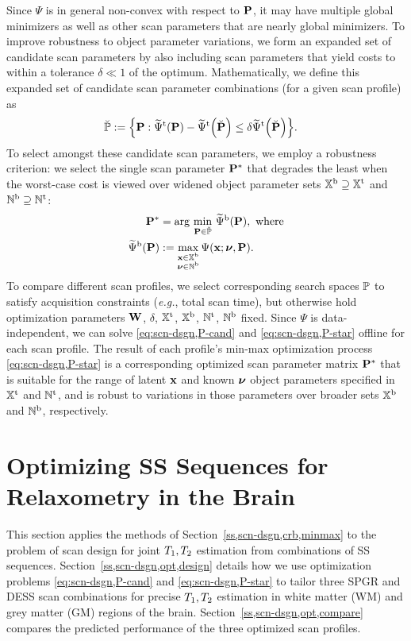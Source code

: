 Since $\Psi$ is in general non-convex 
with respect to $\mathbf{P}$, 
it may have multiple global minimizers 
as well as other scan parameters 
that are nearly global minimizers. 
To improve robustness 
to object parameter variations, 
we form an expanded set of candidate scan parameters 
by also including scan parameters 
that yield costs to within a tolerance $\delta \ll 1$ 
of the optimum. 
Mathematically, 
we define this expanded set 
of candidate scan parameter combinations 
(for a given scan profile) as 
\begin{align}
	\setPc &:= 
		\set{\bmP : \costawt{\bmP} - \costawt{\bmPc} \le \delta \costawt{\bmPc}}.
		\label{eq:scn-dsgn,set}
\end{align}
To select amongst these candidate scan parameters, 
we employ a robustness criterion: 
we select the single scan parameter $\mathbf{P}^*$ 
that degrades the least 
when the worst-case cost is viewed 
over widened object parameter sets 
$\mathbb{X}^\mathrm{b} \supseteq \mathbb{X}^\mathrm{t}$ and $\mathbb{N}^\mathrm{b} \supseteq \mathbb{N}^\mathrm{t}$:
\begin{align}
	\bmPs &= 
		\argmin{\bmP \in \setPc} \costawb{\bmP}, \where
		\label{eq:scn-dsgn,P-star} \\
	\costawb{\bmP} &:=
		\max_{\substack{\bmx \in \setXb \\ \bmnu \in \setNb}}
		\costa{\bmx; \bmnu, \bmP}.
		\label{eq:scn-dsgn,cost-broad}
\end{align}
To compare different scan profiles, 
we select corresponding search spaces $\mathbb{P}$ 
to satisfy acquisition constraints 
(\emph{e.g.}, total scan time), 
but otherwise hold optimization parameters 
$\mathbf{W}$, $\delta$, $\mathbb{X}^\mathrm{t}$, $\mathbb{X}^\mathrm{b}$, $\mathbb{N}^\mathrm{t}$, $\mathbb{N}^\mathrm{b}$ fixed.
Since $\Psi$ is data-independent, 
we can solve \eqref{eq:scn-dsgn,P-cand} and \eqref{eq:scn-dsgn,P-star} offline 
for each scan profile. 
The result of each profile's min-max optimization process \eqref{eq:scn-dsgn,P-star} 
is a corresponding optimized scan parameter matrix $\mathbf{P}^*$ 
that is suitable for the range 
of latent $\mathbf{x}$ and known $\boldsymbol{\nu}$ object parameters specified 
in $\mathbb{X}^\mathrm{t}$ and $\mathbb{N}^\mathrm{t}$, 
and is robust to variations in those parameters 
over broader sets $\mathbb{X}^\mathrm{b}$ and $\mathbb{N}^\mathrm{b}$, 
respectively.

\section{Optimizing SS Sequences for Relaxometry in the Brain}
\label{s,scn-dsgn,opt}

This section applies the methods 
of Section~\ref{ss,scn-dsgn,crb,minmax} 
to the problem of scan design 
for joint $T_1,T_2$ estimation 
from combinations of SS sequences. 
Section~\ref{ss,scn-dsgn,opt,design} details 
how we use optimization problems
\eqref{eq:scn-dsgn,P-cand} and \eqref{eq:scn-dsgn,P-star} 
to tailor three SPGR and DESS scan combinations
for precise $T_1,T_2$ estimation 
in white matter (WM) and grey matter (GM) regions 
of the brain. 
Section~\ref{ss,scn-dsgn,opt,compare} compares the predicted performance 
of the three optimized scan profiles.

